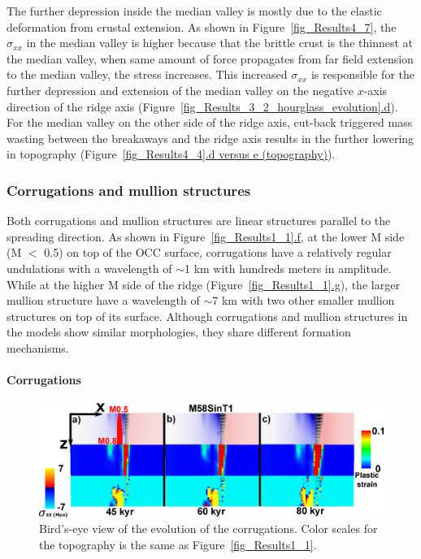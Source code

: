 The further depression inside the median valley is mostly due to the elastic deformation from crustal extension. As shown in Figure~\hyperref[fig_Results4_7]{\ref{fig_Results4_7}}, the $\sigma_{xx}$ in the median valley is higher because that the brittle crust is the thinnest at the median valley, when same amount of force propagates from far field extension to the median valley, the stress increases. This increased $\sigma_{xx}$ is responsible for the further depression and extension of the median valley on the negative $x$-axis direction of the ridge axis (Figure~\hyperref[fig_Results_3_2_hourglass_evolution]{\ref{fig_Results_3_2_hourglass_evolution}.d}). For the median valley on the other side of the ridge axis, cut-back triggered mass wasting between the breakaways and the ridge axis results in the further lowering in topography (Figure~\hyperref[fig_Results4_4]{\ref{fig_Results4_4}.d versus e (topography)}). 

\subsubsection{Corrugations and mullion structures}

Both corrugations and mullion structures are linear structures parallel to the spreading direction. As shown in Figure~\hyperref[fig_Results1_1]{\ref{fig_Results1_1}.f}, at the lower M side (M $<$ 0.5) on top of the OCC surface, corrugations have a relatively regular undulations with a wavelength of $\sim$1 km with hundreds meters in amplitude. While at the higher M side of the ridge (Figure~\hyperref[fig_Results1_1]{\ref{fig_Results1_1}.g}), the larger mullion structure have a wavelength of $\sim$7 km with two other smaller mullion structures on top of its surface. Although corrugations and mullion structures in the models show similar morphologies, they share different formation mechanisms.      

\paragraph{Corrugations}

\begin{figure}[h]
  \centering
    \includegraphics[width=1.0\textwidth]{./Figures/fig_Results_3_2_6_corrugations_evolution.eps}
  \caption{Bird's-eye view of the evolution of the corrugations. Color scales for the topography is the same as Figure~\hyperref[fig_Results1_1]{\ref{fig_Results1_1}}.}
 \label{fig_Results_3_2_6_corrugations_evolution}
\end{figure}

